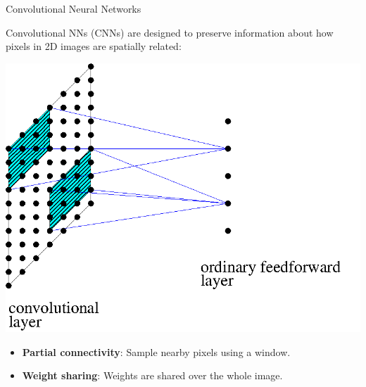 \documentclass[12pt,t]{beamer}
\begin{document}
\begin{frame}{Convolutional Neural Networks}

Convolutional NNs (CNNs) are designed to preserve information about how pixels in 2D images are spatially related:
\centerline{
\includegraphics[height=0.4\textheight]{./images/convolution.png} 
}
\begin{itemize}
\item {\bf  Partial connectivity}: Sample nearby pixels using a window.
\item {\bf Weight sharing}: Weights are shared over the whole image. 
\end{itemize}
\end{frame}
\end{document}

